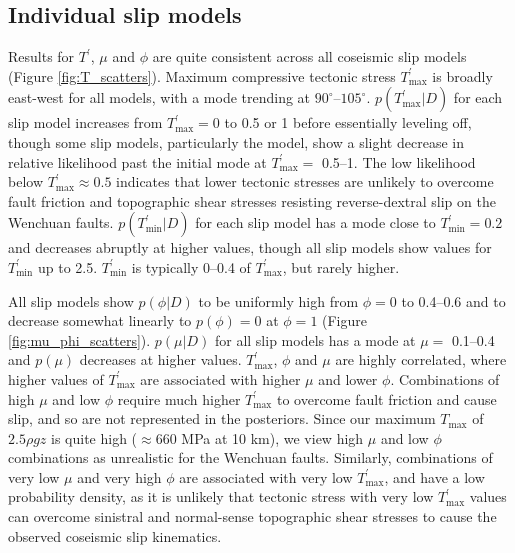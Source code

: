 \documentclass[draft,jgrga]{AGUTeX}
\begin{document}
\begin{article}
\subsection{Individual slip models}\label{individual-slip-models}

Results for $T^\prime$, $\mu$ and $\phi$ are quite consistent across all
coseismic slip models (Figure \ref{fig:T_scatters}). Maximum compressive
tectonic stress $T^\prime_{\mathrm{max}}$ is broadly east-west for all models,
with a mode trending at $90^{\circ}$--$105^{\circ}$.
$p(T^\prime_{\mathrm{max}}|D)$ for each slip model increases from
$T^\prime_{\mathrm{max}} = 0$ to 0.5 or 1 before essentially leveling off, though some
slip models, particularly the \citet{qi2011} model, show a
slight decrease in relative likelihood past the initial mode at
$T^\prime_{\mathrm{max}} =$ 0.5--1.
The low likelihood below $T^\prime_{\mathrm{max}} \approx 0.5$ indicates that lower
tectonic stresses are unlikely to overcome fault friction and
topographic shear stresses resisting reverse-dextral slip on the
Wenchuan faults. $p(T^\prime_{\mathrm{min}} | D)$ for each slip model
has a mode close to $T^\prime_{\mathrm{min}} = 0.2 $ and decreases
abruptly at higher values, though all slip models show values for
$T^\prime_{\mathrm{min}}$ up to 2.5. $T^\prime_{\mathrm{min}}$ is
typically 0--0.4 of $T^\prime_{\mathrm{max}}$, but rarely higher.

All slip models show $p(\phi | D)$ to be uniformly high from $\phi = 0$
to 0.4--0.6 and to decrease somewhat linearly to $p(\phi) = 0$ at $\phi = 1$
(Figure \ref{fig:mu_phi_scatters}). $p(\mu | D)$ for all slip models has
a mode at $\mu =$ 0.1--0.4 and $p(\mu)$ decreases at higher values.
$T^\prime_{\mathrm{max}}$, $\phi$ and $\mu$ are highly correlated, where
higher values of $T^\prime_{\mathrm{max}}$ are associated with higher
$\mu$ and lower $\phi$. Combinations of high $\mu$ and low $\phi$
require much higher $T^\prime_{\mathrm{max}}$ to overcome fault friction
and cause slip, and so are not represented in the posteriors. Since our
maximum $T_{\mathrm{max}}$ of $2.5 \rho g z$ is quite high
($\approx 660$ MPa at 10 km), we view high $\mu$ and low $\phi$
combinations as unrealistic for the Wenchuan faults. Similarly,
combinations of very low $\mu$ and very high $\phi$ are associated with
very low $T^\prime_{\mathrm{max}}$, and have a low probability density,
as it is unlikely that tectonic stress with very low $T^\prime_{\mathrm{max}}$
values can
overcome sinistral and normal-sense topographic shear stresses to cause
the observed coseismic slip kinematics.


\end{article}
\end{document}
